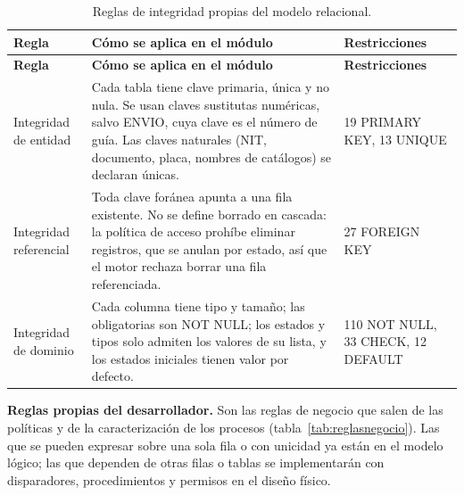 {\singlespacing\small
\begin{longtable}{L{3.2cm} L{8.2cm} L{2.6cm}}
\caption{Reglas de integridad propias del modelo relacional.}
\label{tab:integridad}\\
\toprule
\textbf{Regla} & \textbf{Cómo se aplica en el módulo} & \textbf{Restricciones} \\
\midrule
\endfirsthead
\toprule
\textbf{Regla} & \textbf{Cómo se aplica en el módulo} & \textbf{Restricciones} \\
\midrule
\endhead
\bottomrule
\endfoot
Integridad de entidad & Cada tabla tiene clave primaria, única y no nula. Se usan claves sustitutas numéricas, salvo ENVIO, cuya clave es el número de guía. Las claves naturales (NIT, documento, placa, nombres de catálogos) se declaran únicas. & 19 PRIMARY KEY, 13 UNIQUE \\
\midrule
Integridad referencial & Toda clave foránea apunta a una fila existente. No se define borrado en cascada: la política de acceso prohíbe eliminar registros, que se anulan por estado, así que el motor rechaza borrar una fila referenciada. & 27 FOREIGN KEY \\
\midrule
Integridad de dominio & Cada columna tiene tipo y tamaño; las obligatorias son NOT NULL; los estados y tipos solo admiten los valores de su lista, y los estados iniciales tienen valor por defecto. & 110 NOT NULL, 33 CHECK, 12 DEFAULT \\
\end{longtable}
\par}

\textbf{Reglas propias del desarrollador.} Son las reglas de negocio
que salen de las políticas y de la caracterización de los procesos
(tabla~\ref{tab:reglasnegocio}). Las que se pueden expresar sobre una
sola fila o con unicidad ya están en el modelo lógico; las que
dependen de otras filas o tablas se implementarán con disparadores,
procedimientos y permisos en el diseño físico.

